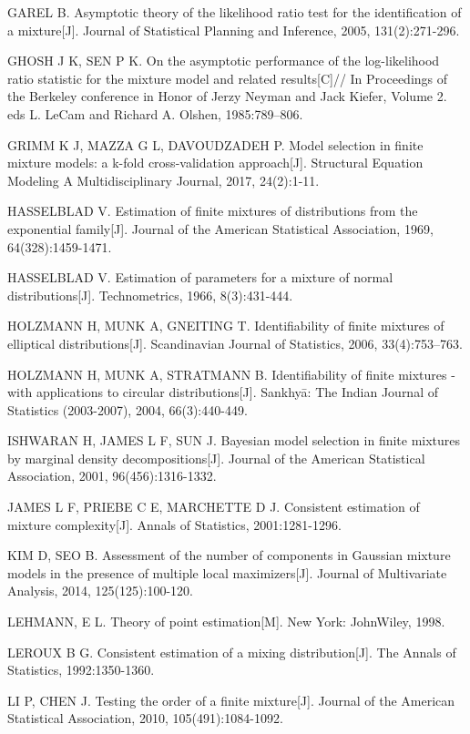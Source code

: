 \documentclass[a4paper,12pt,openany,oneside,utf-8]{ctexbook}
\begin{document}
\begin{enumerate}[{[}1{]}]
\item 	GAREL B. Asymptotic theory of the likelihood ratio test for the identification of a mixture[J]. Journal of Statistical Planning and Inference, 2005, 131(2):271-296.
\item 	GHOSH J K, SEN P K. On the asymptotic performance of the log-likelihood ratio statistic for the mixture model and related results[C]// In Proceedings of the Berkeley conference in Honor of Jerzy Neyman and Jack Kiefer, Volume 2. eds L. LeCam and Richard A. Olshen, 1985:789--806.
\item 	GRIMM K J, MAZZA G L, DAVOUDZADEH P. Model selection in finite mixture models: a k-fold cross-validation approach[J]. Structural Equation Modeling A Multidisciplinary Journal, 2017, 24(2):1-11.
\item 	HASSELBLAD V. Estimation of finite mixtures of distributions from the exponential family[J]. Journal of the American Statistical Association, 1969, 64(328):1459-1471.
\item 	HASSELBLAD V. Estimation of parameters for a mixture of normal distributions[J]. Technometrics, 1966, 8(3):431-444.
\item 	HOLZMANN H, MUNK A, GNEITING T. Identifiability of finite mixtures of elliptical distributions[J]. Scandinavian Journal of Statistics, 2006, 33(4):753–763.
\item 	HOLZMANN H, MUNK A, STRATMANN B. Identifiability of finite mixtures - with applications to circular distributions[J]. Sankhyā: The Indian Journal of Statistics (2003-2007), 2004, 66(3):440-449.
\item 	ISHWARAN H, JAMES L F, SUN J. Bayesian model selection in finite mixtures by marginal density decompositions[J]. Journal of the American Statistical Association, 2001, 96(456):1316-1332.
\item 	JAMES L F, PRIEBE C E, MARCHETTE D J. Consistent estimation of mixture complexity[J]. Annals of Statistics, 2001:1281-1296.
\item 	KIM D, SEO B. Assessment of the number of components in Gaussian mixture models in the presence of multiple local maximizers[J]. Journal of Multivariate Analysis, 2014, 125(125):100-120.
\item 	LEHMANN, E L. Theory of point estimation[M]. New York: JohnWiley, 1998.
\item 	LEROUX B G. Consistent estimation of a mixing distribution[J]. The Annals of Statistics, 1992:1350-1360.
\item 	LI P, CHEN J. Testing the order of a finite mixture[J]. Journal of the American Statistical Association, 2010, 105(491):1084-1092.

\end{enumerate}
\end{document}
